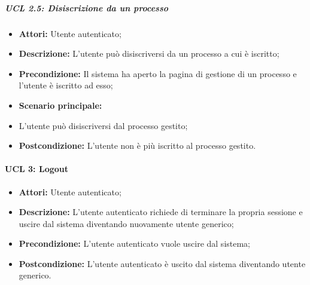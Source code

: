 \subparagraph{UCL 2.5: Disiscrizione da un processo}
\begin{itemize}
\item \textbf{Attori:} Utente autenticato;
\item \textbf{Descrizione:} L'utente può disiscriversi da un processo a cui è iscritto;
\item \textbf{Precondizione:} Il sistema ha aperto la pagina di gestione di un processo e l'utente è iscritto ad esso;
\item \textbf{Scenario principale:}
\item L'utente può disiscriversi dal processo gestito;
\item \textbf{Postcondizione:} L'utente non è più iscritto al processo gestito.
\end{itemize}

\paragraph{UCL 3: Logout}
\begin{itemize}
	\item \textbf{Attori:} Utente autenticato;
	\item \textbf{Descrizione:} L'utente autenticato richiede di terminare la propria sessione e uscire dal sistema diventando nuovamente utente generico;
	\item \textbf{Precondizione:} L'utente autenticato vuole uscire dal sistema;
	\item \textbf{Postcondizione:} L'utente autenticato è uscito dal sistema diventando utente generico.
\end{itemize}